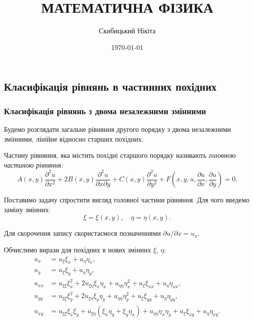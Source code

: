

\title{{\Huge МАТЕМАТИЧНА ФІЗИКА}}
\author{Скибицький Нікіта}
\date{\today}





\tableofcontents

\setcounter{section}{3}
\setcounter{subsection}{6}

\subsection{Класифікація рівнянь в частинних похідних}

\subsubsection{Класифікація рівнянь з двома незалежними змінними}

Будемо розглядати загальне рівняння другого порядку з двома незалежними змінними, лінійне відносно старших похідних.
\begin{definition}
	Частину рівняння, яка містить похідні старшого порядку називають \it{головною} частиною рівняння:
	\begin{equation}
		A(x,y)\dfrac{\partial^2u}{\partial x^2}+2B(x,y)\dfrac{\partial^2u}{\partial x\partial y}+C(x,y)\dfrac{\partial^2u}{\partial y^2}+F\left(x,y,u,\dfrac{\partial u}{\partial x},\dfrac{\partial u}{\partial y}\right)=0.
	\end{equation}
\end{definition}

Поставимо задачу спростити вигляд головної частини рівняння. Для чого введемо заміну змінних: 
\begin{equation}
	\xi = \xi(x, y), \quad \eta = \eta(x, y).
\end{equation}

Для скорочення запису скористаємося позначеннями  $\partial u / \partial x = u_x$. \medskip

Обчислимо вирази для похідних в нових змінних $\xi$, $\eta$:
\begin{align}
	u_x &= u_\xi \xi_x + u_\eta \eta_x, \\
	u_y &= u_\xi \xi_y + u_\eta \eta_y, \\
	u_{xx} &= u_{\xi\xi} \xi_x^2 + 2 u_{\xi\eta} \xi_x \eta_x + u_{\eta\eta} \eta_x^2 + u_\xi \xi_{xx} + u_\eta \eta_{xx}, \\
	u_{yy} &= u_{\xi\xi} \xi_y^2 + 2 u_{\xi\eta} \xi_y \eta_y + u_{\eta\eta} \eta_y^2 + u_\xi \xi_{yy} + u_\eta \eta_{yy}, \\
	u_{xy} &= u_{\xi\xi} \xi_x \xi_y + u_{\xi\eta} (\xi_x \eta_y + \xi_y \eta_x) + u_{\eta\eta} \eta_x \eta_y + u_\xi \xi_{xy} + u_\eta \eta_{xy}.
\end{align}

